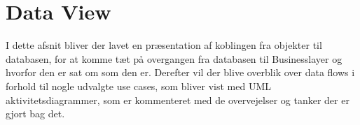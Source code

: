 \section{Data View}
I dette afsnit bliver der lavet en præsentation af koblingen fra objekter til databasen, for at komme tæt på overgangen fra databasen til Businesslayer og hvorfor den er sat om som den er. Derefter vil der blive overblik over data flows i forhold til nogle udvalgte use cases, som bliver vist med UML aktivitetsdiagrammer, som er kommenteret med de overvejelser og tanker der er gjort bag det. 





